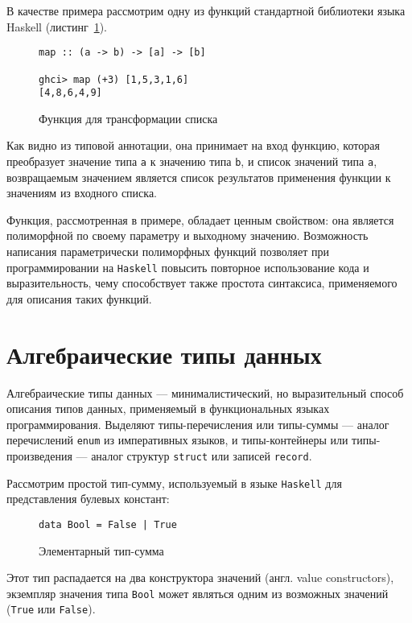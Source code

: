 В качестве примера рассмотрим одну из функций стандартной библиотеки языка
Haskell (листинг~\ref{listing:map}).

\begin{figure}[h]
\begin{lstlisting}
map :: (a -> b) -> [a] -> [b]

ghci> map (+3) [1,5,3,1,6]
[4,8,6,4,9]
\end{lstlisting}
\caption{Функция для трансформации списка}
\label{listing:map}
\end{figure}

Как видно из типовой аннотации, она принимает на вход функцию, которая преобразует
значение типа \lstinline{a} к значению типа \lstinline{b}, и список значений
типа \lstinline{a}, возвращаемым значением является список результатов
применения функции к значениям из входного списка.

Функция, рассмотренная в примере, обладает ценным свойством: она является
полиморфной по своему параметру и выходному значению. Возможность написания
параметрически полиморфных функций позволяет при программировании на
\lstinline{Haskell} повысить повторное использование кода и выразительность,
чему способствует также простота синтаксиса, применяемого для описания таких
функций.

\section{Алгебраические типы данных}

Алгебраические типы данных --- минималистический, но выразительный способ
описания типов данных, применяемый в функциональных языках программирования.
Выделяют типы-перечисления или типы-суммы --- аналог перечислений
\lstinline{enum} из императивных языков, и типы-контейнеры или типы-произведения
 --- аналог структур \lstinline{struct} или записей \lstinline{record}.


Рассмотрим простой тип-сумму, используемый в языке \lstinline{Haskell} для
представления булевых констант:

\begin{figure}[h]
\begin{lstlisting}
data Bool = False | True
\end{lstlisting}
\caption{Элементарный тип-сумма}
\label{listing:Bool}
\end{figure}

Этот тип распадается на два конструктора значений (англ. value constructors),
экземпляр значения типа \lstinline{Bool} может являться одним из возможных
значений (\lstinline{True} или \lstinline{False}).

